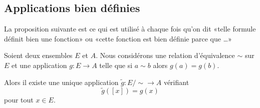 \subsection{Applications bien définies}

La proposition suivante est ce qui est utilisé à chaque fois qu'on dit «telle formule définit bien une fonction» ou «cette fonction est bien définie parce que \ldots»

\begin{proposition}	\label{PROPooCONJooTpJwBe}
	Soient deux ensembles \( E\) et \( A\). Nous considérons une relation d'équivalence \( \sim\) sur \( E\) et une application \(g \colon E\to A  \) telle que si \( a\sim b\) alors \( g(a)=g(b)\).

	Alors il existe une unique application \(\tilde g  \colon E/\sim\to A  \) vérifiant
	\begin{equation}	\label{EQooCTHKooTXPfyh}
		\tilde g([x])=g(x)
	\end{equation}
	pour tout \( x\in E\).
\end{proposition}

